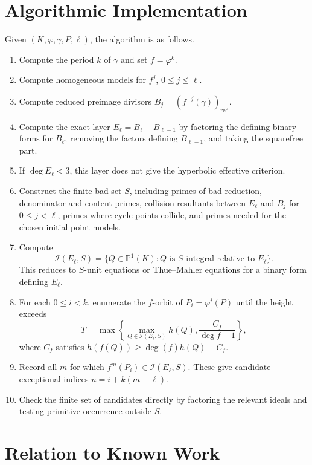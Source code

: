 \documentclass[11pt]{article}
\begin{document}
\section{Algorithmic Implementation}

Given \((K,\varphi,\gamma,P,\ell)\), the algorithm is as follows.
\begin{enumerate}[label=(\arabic*)]
\item Compute the period \(k\) of \(\gamma\) and set \(f=\varphi^k\).
\item Compute homogeneous models for \(f^j\), \(0\le j\le\ell\).
\item Compute reduced preimage divisors \(B_j=(f^{-j}(\gamma))_{\mathrm{red}}\).
\item Compute the exact layer \(E_\ell=B_\ell-B_{\ell-1}\) by factoring the defining binary forms for \(B_\ell\), removing the factors defining \(B_{\ell-1}\), and taking the squarefree part.
\item If \(\deg E_\ell<3\), this layer does not give the hyperbolic effective criterion.
\item Construct the finite bad set \(S\), including primes of bad reduction, denominator and content primes, collision resultants between \(E_\ell\) and \(B_j\) for \(0\le j<\ell\), primes where cycle points collide, and primes needed for the chosen initial point models.
\item Compute
\[
\mathcal I(E_\ell,S)
=
\{Q\in\mathbb P^1(K):Q\text{ is }S\text{-integral relative to }E_\ell\}.
\]
This reduces to \(S\)-unit equations or Thue--Mahler equations for a binary form defining \(E_\ell\).
\item For each \(0\le i<k\), enumerate the \(f\)-orbit of \(P_i=\varphi^i(P)\) until the height exceeds
\[
T=\max\left\{
\max_{Q\in\mathcal I(E_\ell,S)}h(Q),
\frac{C_f}{\deg f-1}
\right\},
\]
where \(C_f\) satisfies \(h(f(Q))\ge \deg(f)h(Q)-C_f\).
\item Record all \(m\) for which \(f^m(P_i)\in\mathcal I(E_\ell,S)\). These give candidate exceptional indices \(n=i+k(m+\ell)\).
\item Check the finite set of candidates directly by factoring the relevant ideals and testing primitive occurrence outside \(S\).
\end{enumerate}

\section{Relation to Known Work}
\end{document}
